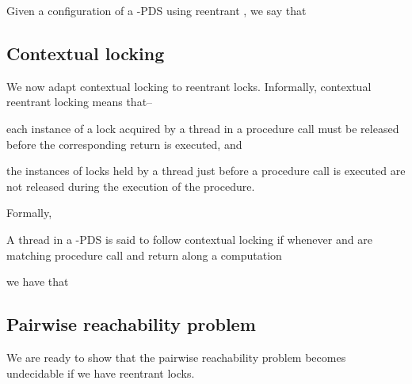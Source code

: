 \documentclass{LMCS}
\begin{document}
\begin{notation}
Given a configuration  of a -PDS  using reentrant ,
we say that 
\end{notation}


\subsection{Contextual locking}
We now adapt contextual locking to reentrant locks. Informally, contextual reentrant locking means that--
\begin{iteMize}{}
\item each instance of a lock acquired by a thread in a
procedure call must be released before the corresponding return is executed, and
\item the instances of locks held by a thread just before a procedure call is executed are not released during the
execution of the procedure.
\end{iteMize}
Formally,
 \begin{definition}
A thread  in a -PDS  is said to follow contextual locking if whenever 
and  are matching procedure call and return  along a computation

we have that

 \end{definition}



\subsection{Pairwise reachability problem}
We are ready to show that the pairwise reachability problem becomes undecidable if we have reentrant locks. 
\end{document}
